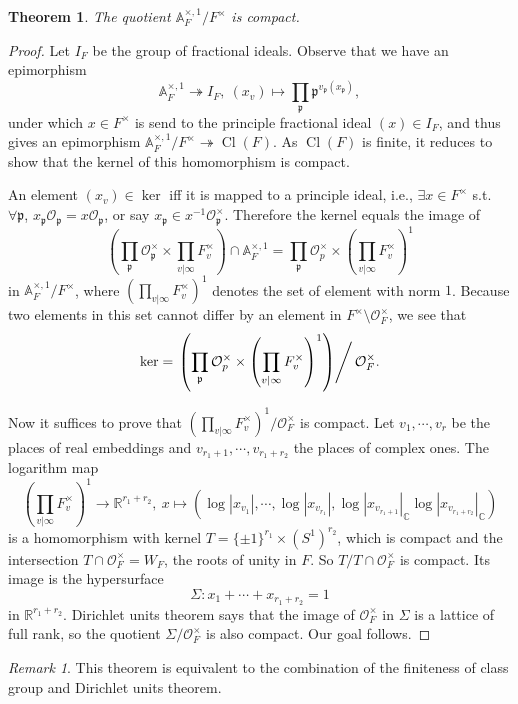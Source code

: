 \documentclass{article}
\newtheorem{theorem}{Theorem}
\theoremstyle{definition}
\theoremstyle{remark}
\newtheorem*{remark}{Remark}
\newcommand{\R}{\mathbb{R}}
\newcommand{\C}{\mathbb{C}}
\newcommand{\ideone}[1]{\mathbb{A}_{#1}^{\times, 1}}
\newcommand{\idecl}[1]{\mathbb{A}_{#1}^{\times, 1}/#1^{\times}}
\renewcommand{\O}{\mathcal{O}}
\newcommand{\frp}{\mathfrak{p}}
\DeclareMathOperator{\cl}{Cl}
\begin{document}
\begin{theorem}
    The quotient $\ideone{F}/F^{\times}$ is compact.
\end{theorem}
\begin{proof}
    Let $I_F$ be the group of fractional ideals.
    Observe that we have an epimorphism \[\ideone{F}\twoheadrightarrow  I_F,\ (x_v)\mapsto \prod_{\frp} \frp^{v_{\frp}(x_\frp)},\]
    under which $x\in F^\times$ is send to the principle fractional ideal $(x)\in I_F$, and thus gives an epimorphism $\idecl{F}\twoheadrightarrow \cl(F)$.
    As $\cl(F)$ is finite, it reduces to show that the kernel of this homomorphism is compact.

    An element $(x_v)\in\ker$ iff it is mapped to a principle ideal, i.e., $\exists x\in F^{\times}$ s.t. $\forall \frp$, $x_\frp\O_\frp = x\O_\frp$, or say $x_\frp\in x^{-1}\O_\frp^\times$.
    Therefore the kernel equals the image of \[\left(\prod_\frp\O_\frp^\times\times\prod_{v|\infty} F_v^\times\right) \cap\ideone{F} = \prod_\frp \O_p^\times\times\left( \prod_{v|\infty} F_v^{\times} \right)^1\]
    in $\idecl{F}$, where $\left( \prod_{v|\infty} F_v^{\times} \right)^1$ denotes the set of element with norm $1$.
    Because two elements in this set cannot differ by an element in $F^\times\setminus\O_F^\times$, we see that\[\ker = \left.\left( \prod_\frp \O_p^\times\times\left( \prod_{v|\infty} F_v^{\times} \right)^1 \right)\right\slash \O_F^\times.\]

    Now it suffices to prove that $\left( \prod_{v|\infty} F_v^{\times} \right)^1\big/\O_F^\times$ is compact.
    Let $v_1, \cdots, v_r$ be the places of real embeddings and $v_{r_1+1},\cdots,  v_{r_1+r_2}$ the places of complex ones.
    The logarithm map \[\left( \prod_{v|\infty} F_v^{\times} \right)^1\to\R^{r_1+r_2},\ x\mapsto (\log|x_{v_1}|, \cdots, \log|x_{v_{r_1}}|,\log|x_{v_{r_1+1}} |_{\C} \log|x_{v_{r_1+r_2}}|_\C)\]
    is a homomorphism with kernel $T = \{\pm 1\}^{r_1}\times (S^1)^{r_2}$, which is compact and the intersection $T\cap\O_F^\times = W_F$, the roots of unity in $F$. So $T/T\cap\O_F^\times$ is compact.
    Its image is the hypersurface \[\Sigma: x_1 + \cdots + x_{r_1+r_2} = 1\] in $\R^{r_1+r_2}$.
    Dirichlet units theorem says that the image of $\O_F^\times$ in $\Sigma$ is a lattice of full rank, so the quotient $\Sigma/\O_F^\times$ is also compact.
    Our goal follows.
\end{proof}
\begin{remark}
    This theorem is equivalent to the combination of the finiteness of class group and Dirichlet units theorem.
\end{remark}
\end{document}
